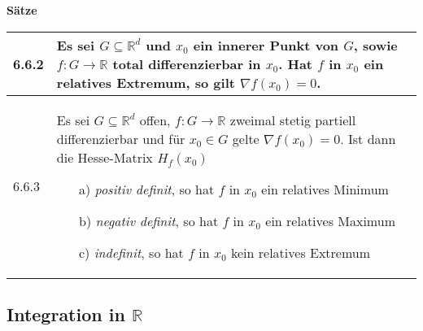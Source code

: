     \noindent 
    \textbf{Sätze}
    \begin{table}[H]
    \begin{tabularx}{\textwidth}{X m{16cm}}
        \toprule

        6.6.2 & Es sei $G \subseteq \mathbb{R}^d$ und $x_0$ ein innerer Punkt von $G$, sowie $f: G \rightarrow \mathbb{R}$ total
                differenzierbar in $x_0$. Hat $f$ in $x_0$ ein relatives Extremum, so gilt $\nabla f(x_0) = 0$. \\
        \midrule
        6.6.3 & Es sei $G \subseteq \mathbb{R}^d$ offen, $f: G \rightarrow \mathbb{R}$ zweimal stetig partiell differenzierbar und für
                $x_0 \in G$ gelte $\nabla f(x_0) = 0$. Ist dann die Hesse-Matrix $H_f(x_0)$ 
                \begin{itemize}[topsep=-0.5cm]
                    \item[a)] \textit{positiv definit}, so hat $f$ in $x_0$ ein relatives Minimum
                    \item[b)] \textit{negativ definit}, so hat $f$ in $x_0$ ein relatives Maximum
                    \item[c)] \textit{indefinit}, so hat $f$ in $x_0$ kein relatives Extremum
                \end{itemize} \vspace{-0cm} \\


        \bottomrule
    \end{tabularx}
    \end{table}

\subsection{Integration in $\mathbb{R}$}
